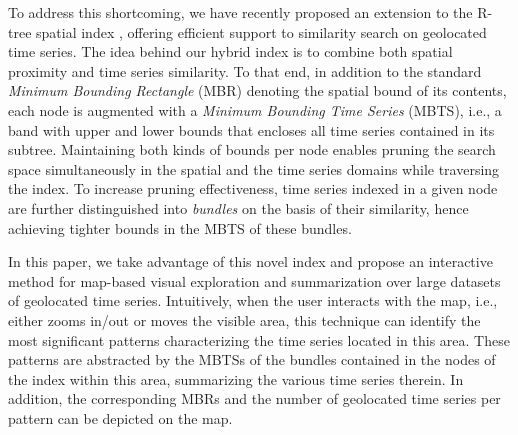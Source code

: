 To address this shortcoming, we have recently proposed an extension to the R-tree spatial index \cite{Guttman1984}, offering efficient support to similarity search on geolocated time series. The idea behind our \emph{\btsr} hybrid index \cite{chatzig17btsr} is to combine both spatial proximity and time series similarity. To that end, in addition to the standard \emph{Minimum Bounding Rectangle} (MBR) denoting the spatial bound of its contents, each node is augmented with a \emph{Minimum Bounding Time Series} (MBTS), i.e., a band with upper and lower bounds that encloses all time series contained in its subtree. Maintaining both kinds of bounds per node enables pruning the search space simultaneously in the spatial and the time series domains while traversing the index. To increase pruning effectiveness, time series indexed in a given node are further distinguished into {\em bundles} on the basis of their similarity, hence achieving tighter bounds in the MBTS of these bundles.

In this paper, we take advantage of this novel \btsr index and propose an interactive method for map-based visual exploration and summarization over large datasets of geolocated time series. Intuitively, when the user interacts with the map, i.e., either zooms in/out or moves the visible area, this technique can identify the most significant patterns characterizing the time series located in this area. These patterns are abstracted by the MBTSs of the bundles contained in the nodes of the \btsr index within this area, summarizing the various time series therein. In addition, the corresponding MBRs and the number of geolocated time series per pattern can be depicted on the map. 

